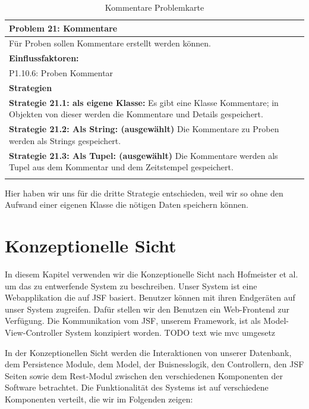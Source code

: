 \documentclass[enabledeprecatedfontcommands,fontsize=12pt,paper=a4,twoside]{scrartcl}
\begin{document}
\begin{table}[H]
    \centering
    \begin{tabular}{|p{15cm}|}
    \hline
          \textbf{Problem 21:} Kommentare
          \\ \hline
          Für Proben sollen Kommentare erstellt werden können. 
          \\ \hline
          \textbf{Einflussfaktoren: } \\
         P1.10.6: Proben Kommentar \\ 
          \hline
          \textbf{Strategien} \\ \hline
          {}          
           \label{strategie:21.1} 
	\textbf{Strategie 21.1: als eigene Klasse: } Es gibt eine Klasse Kommentare; in Objekten von dieser werden die Kommentare und Details gespeichert. \\
	{}          
           \label{strategie:21.2} 
	\textbf{Strategie 21.2: Als String: (ausgewählt)} Die Kommentare zu Proben werden als Strings gespeichert. \\
	  \label{strategie:21.3} 
	\textbf{Strategie 21.3: Als Tupel: (ausgewählt)} Die Kommentare werden als Tupel aus dem Kommentar und dem Zeitstempel gespeichert. \\
          \\ \hline
    \end{tabular}
    \caption{Kommentare Problemkarte}
    \label{tab:ProblemKarte21}
\end{table}
Hier haben wir uns für die dritte Strategie entschieden, weil wir so ohne den Aufwand einer eigenen Klasse die nötigen Daten speichern können. \\



\section{Konzeptionelle Sicht}
\label{sec:konzeptionell} { %
In diesem Kapitel verwenden wir die Konzeptionelle Sicht nach Hofmeister
et al. um das zu entwerfende System zu beschreiben. Unser System ist eine
Webapplikation die auf JSF basiert. Benutzer können mit ihren Endgeräten auf
unser System zugreifen. Dafür stellen wir den Benutzen ein Web-Frontend
zur Verfügung. Die Kommunikation vom JSF, unserem Framework, ist als
Model-View-Controller System konzipiert worden. TODO text wie mvc umgesetz

  In der Konzeptionellen Sicht werden die Interaktionen von unserer Datenbank,
dem Persistence Module, dem Model, der Buisnesslogik, den Controllern, den JSF
Seiten sowie dem Rest-Modul zwischen den verschiedenen Komponenten der Software
betrachtet. Die Funktionalität des Systems ist auf verschiedene Komponenten
verteilt, die wir im Folgenden zeigen:\\
}
\end{document}
